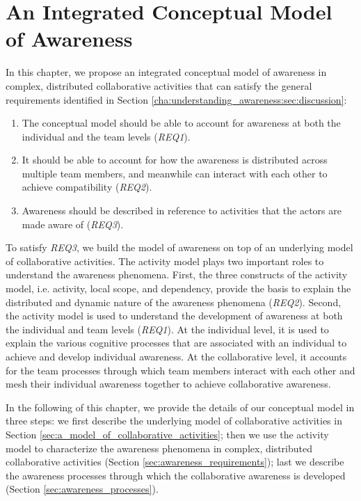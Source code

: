 \graphicspath{{Figures/}}

\chapter{An Integrated Conceptual Model of Awareness} %
\label{cha:the_conceptual_framework}
In this chapter, we propose an integrated conceptual model of awareness in complex, distributed collaborative activities that can satisfy the general requirements identified in Section \ref{cha:understanding_awareness:sec:discussion}:

\begin{enumerate}
	\item The conceptual model should be able to account for awareness at both the individual and the team levels (\emph{REQ1}).
	\item It should be able to account for how the awareness is distributed across multiple team members, and meanwhile can interact with each other to achieve compatibility (\emph{REQ2}). 
	\item Awareness should be described in reference to activities that the actors are made aware of (\emph{REQ3}).
\end{enumerate}

To satisfy \emph{REQ3}, we build the model of awareness on top of an underlying model of collaborative activities. The activity model plays two important roles to understand the awareness phenomena. First, the three constructs of the activity model, i.e. activity, local scope, and dependency, provide the basis to explain the distributed and dynamic nature of the awareness phenomena (\emph{REQ2}). Second, the activity model is used to understand the development of awareness at both the individual and team levels (\emph{REQ1}). At the individual level, it is used to explain the various cognitive processes that are associated with an individual to achieve and develop individual awareness. At the collaborative level, it accounts for the team processes through which team members interact with each other and mesh their individual awareness together to achieve collaborative awareness. 

In the following of this chapter, we provide the details of our conceptual model in three steps: we first describe the underlying model of collaborative activities in Section \ref{sec:a_model_of_collaborative_activities}; then we use the activity model to characterize the awareness phenomena in complex, distributed collaborative activities (Section \ref{sec:awareness_requirements}); last we describe the awareness processes through which the collaborative awareness is developed (Section \ref{sec:awareness_processes}).

